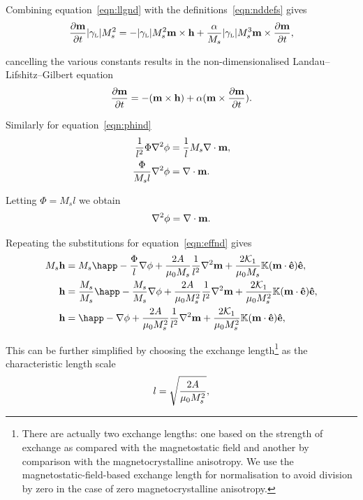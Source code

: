 Combining equation~\eqref{eqn:llgnd} with the definitions~\eqref{eqn:nddefs} gives
\begin{equation}
  \notag
  \frac{\partial \mathbf{m}}{\partial t} {\left|{\gamma_{\text{\tiny{L}}}} \right|} M_s^2 =
  - {\left|{\gamma_{\text{\tiny{L}}}} \right|} M_s^2 \mathbf{m} \times \mathbf{h} + \frac{\alpha}{M_s} {\left|{\gamma_{\text{\tiny{L}}}} \right|} M_s^3 \mathbf{m} \times \frac{\partial \mathbf{m}}{\partial t},
\end{equation}

cancelling the various constants results in the non-dimensionalised Landau--Lifshitz--Gilbert equation
\begin{equation}
  \label{eq:53}
  \frac{\partial \mathbf{m}}{\partial t} = - (\mathbf{m} \times \mathbf{h}) + \alpha (\mathbf{m} \times \frac{\partial \mathbf{m}}{\partial t}).
\end{equation}

Similarly for equation~\eqref{eqn:phind}
\begin{align*}
  \frac{1}{l^2} \Phi \nabla^{2} \phi &= \frac{1}{l} M_s \nabla \cdot \mathbf{m}, \\
  \frac{\Phi}{M_s l} \nabla^{2} \phi &= \nabla \cdot \mathbf{m}.
\end{align*}

Letting $\Phi = M_s l$ we obtain
\begin{equation}
  \label{eq:57}
  \nabla^2 \phi = \nabla \cdot \mathbf{m}.
\end{equation}

Repeating the substitutions for equation~\eqref{eqn:effnd} gives
\begin{align*}
  M_s \hv &= M_s \happ - \frac{\Phi}{l} \nabla \phi + \frac{2 \Exchc }{\mu_0 M_s} \frac{1}{l^2} \lap \mv + \frac{2\kone}{\mu_0 M_s}  \nK (\mv \cdot \ev) \ev, \\
  \hv &= \frac{M_s}{M_s} \happ - \frac{M_s}{M_s} \nabla \phi + \frac{2 \Exchc}{\mu_0 M_s^2} \frac{1}{l^2} \lap \mv + \frac{2\kone}{\mu_0 M_s^2} \nK (\mv \cdot \ev) \ev, \\
  \hv &= \happ - \nabla \phi + \frac{2 \Exchc}{\mu_0 M_s^2} \frac{1}{l^2} \lap \mv + \frac{2\kone}{\mu_0 M_s^2} \nK (\mv \cdot \ev) \ev, \\
\end{align*}

This can be further simplified by choosing the exchange length\footnote{There are actually two exchange lengths: one based on the strength of exchange as compared with the magnetostatic field and another by comparison with the magnetocrystalline anisotropy. We use the magnetostatic-field-based exchange length for normalisation to avoid division by zero in the case of zero magnetocrystalline anisotropy.} as the characteristic length scale
\begin{equation}
  \label{eqn:l-normalisation}
  l = \sqrt{ \frac{2 A}{\mu_0 M_s^2} },
\end{equation}

